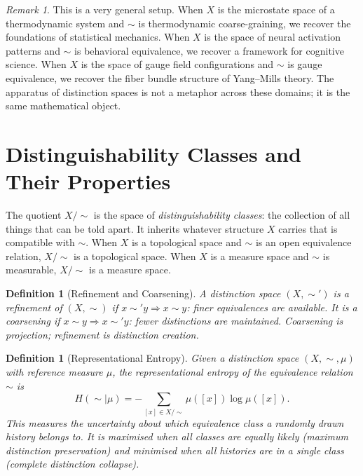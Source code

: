 \documentclass[12pt,a4paper]{book}
\newtheorem{definition}[theorem]{Definition}
\theoremstyle{remark}
\newtheorem{remark}{Remark}[chapter]
\theoremstyle{definition}
\begin{document}
\begin{remark}
This is a very general setup. When $X$ is the microstate space of a
thermodynamic system and $\sim$ is thermodynamic coarse-graining, we
recover the foundations of statistical mechanics. When $X$ is the space
of neural activation patterns and $\sim$ is behavioral equivalence, we
recover a framework for cognitive science. When $X$ is the space of gauge
field configurations and $\sim$ is gauge equivalence, we recover the fiber
bundle structure of Yang--Mills theory. The apparatus of distinction spaces
is not a metaphor across these domains; it is the same mathematical object.
\end{remark}

\section{Distinguishability Classes and Their Properties}

The quotient $X/{\sim}$ is the space of \emph{distinguishability classes}:
the collection of all things that can be told apart. It inherits whatever
structure $X$ carries that is compatible with $\sim$. When $X$ is a
topological space and $\sim$ is an open equivalence relation, $X/{\sim}$
is a topological space. When $X$ is a measure space and $\sim$ is
measurable, $X/{\sim}$ is a measure space.

\begin{definition}[Refinement and Coarsening]
A distinction space $(X, \sim')$ is a \emph{refinement} of $(X, \sim)$
if $x \sim' y \Rightarrow x \sim y$: finer equivalences are available.
It is a \emph{coarsening} if $x \sim y \Rightarrow x \sim' y$: fewer
distinctions are maintained. Coarsening is projection; refinement is
distinction creation.
\end{definition}

\begin{definition}[Representational Entropy]
Given a distinction space $(X, \sim, \mu)$ with reference measure $\mu$,
the \emph{representational entropy} of the equivalence relation $\sim$
is
\begin{equation}
  H(\sim \mid \mu)
  = -\sum_{[x] \in X/\sim} \mu([x]) \log \mu([x]).
\end{equation}
This measures the uncertainty about which equivalence class a randomly
drawn history belongs to. It is maximised when all classes are equally
likely (maximum distinction preservation) and minimised when all histories
are in a single class (complete distinction collapse).
\end{definition}
\end{document}

